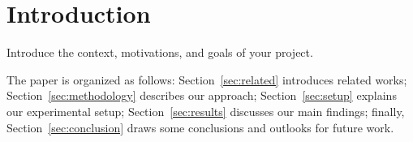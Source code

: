 \section{Introduction}
\label{sec:introduction}

Introduce the context, motivations, and goals of your project.

The paper is organized as follows: Section~\ref{sec:related} introduces related works; Section~\ref{sec:methodology} describes our approach; Section~\ref{sec:setup} explains our experimental setup; Section~\ref{sec:results} discusses our main findings; finally, Section~\ref{sec:conclusion} draws some conclusions and outlooks for future work.